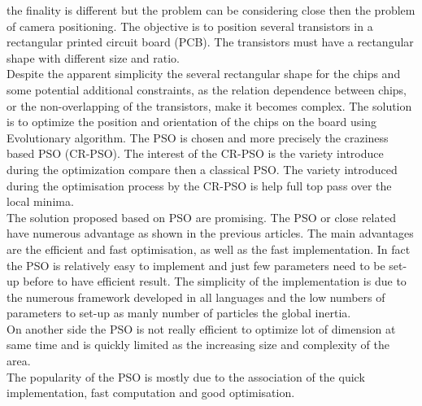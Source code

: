  \cite{143*maji2015} the finality is different but the problem can be considering close then the problem of camera positioning. 
The objective is to position several transistors in a rectangular printed circuit board (PCB).
The transistors must have a rectangular shape with different size and ratio. \\
  Despite the apparent simplicity the several rectangular shape for the chips and some potential additional constraints, as the relation dependence  between chips, or the non-overlapping of the transistors, make it becomes complex.  The solution is to optimize the position and orientation of the chips on the board using Evolutionary algorithm. The  PSO is chosen and more precisely the craziness based PSO (CR-PSO). The interest of the CR-PSO is the variety introduce during the optimization compare then a classical PSO. The variety introduced during the optimisation process by the  CR-PSO is help full top  pass over the  local minima.\\
  
The solution proposed based on PSO are promising. The PSO or close related have numerous advantage as shown in the previous articles.
 The main advantages are the efficient and fast optimisation, as well as the fast implementation. In fact the PSO is  relatively easy to implement and just few parameters need to be set-up before to have efficient result. The simplicity of the implementation is due to the numerous framework developed in all languages and the  low numbers of parameters to set-up as manly number of particles the global inertia.\\ 	
  On another side the PSO is not really efficient to optimize lot of dimension at same time and is quickly limited as the increasing size and complexity of the area.\\
The popularity of the PSO is mostly due to the association of the quick implementation, fast computation and good optimisation.
 
